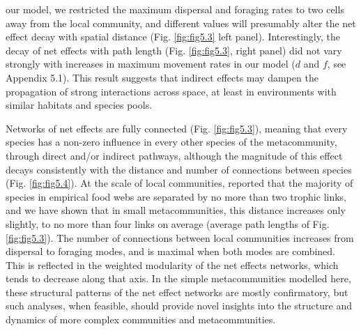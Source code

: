 our model, we restricted the maximum dispersal and foraging rates to two cells away from the local community, and different values will presumably alter the net effect decay with spatial distance (Fig.  \ref{fig:fig5.3} left panel). Interestingly, the decay of net effects with path length (Fig.  \ref{fig:fig5.3}, right panel) did not vary strongly with increases in maximum movement rates in our model ($d$ and $f$, see Appendix 5.1). This result suggests that indirect effects may dampen the propagation of strong interactions across space, at least in environments with similar habitats and species pools.

Networks of net effects are fully connected (Fig. \ref{fig:fig5.3}), meaning that every species has a non-zero influence in every other species of the metacommunity, through direct and/or indirect pathways, although the magnitude of this effect decays consistently with the distance and number of connections between species (Fig. \ref{fig:fig5.4}). At the scale of local communities, \cite{Williams2002} reported that the majority of species in empirical food webs are separated by no more than two trophic links, and we have shown that in small metacommunities, this distance increases only slightly, to no more than four links on average (average path lengths of Fig. \ref{fig:fig5.3}). The number of connections between local communities increases from dispersal to foraging modes, and is maximal when both modes are combined. This is reflected in the weighted modularity of the net effects networks, which tends to decrease along that axis. In the simple metacommunities modelled here, these structural patterns of the net effect networks are mostly confirmatory, but such analyses, when feasible, should provide novel insights into the structure and dynamics of more complex communities and metacommunities.

